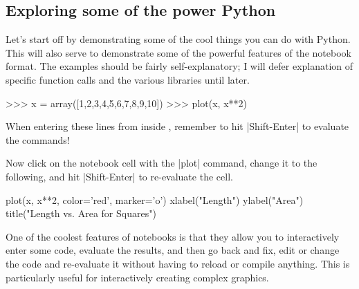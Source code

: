 \subsection{Exploring some of the power Python}

Let's start off by demonstrating some of the cool things you can do with Python. This will also serve to demonstrate some of the powerful features of the \ipy notebook format. The examples should be fairly self-explanatory; I will defer explanation of specific function calls and the various libraries until later.
%
\begin{python}
>>> x = array([1,2,3,4,5,6,7,8,9,10])
>>> plot(x, x**2)
\end{python}

\begin{alert}
    When entering these lines from inside \ipy, remember to hit |Shift-Enter| to evaluate the commands!
\end{alert}

Now click on the notebook cell with the |plot| command, change it to the following, and hit |Shift-Enter| to re-evaluate the cell.
%
\begin{python}
plot(x, x**2, color='red', marker='o')
xlabel("Length")
ylabel("Area")
title("Length vs. Area for Squares")
\end{python}
%
One of the coolest features of \ipy notebooks is that they allow you to interactively enter some code, evaluate the results, and then go back and fix, edit or change the code and re-evaluate it without having to reload or compile anything. This is particularly useful for interactively creating complex graphics.
%

